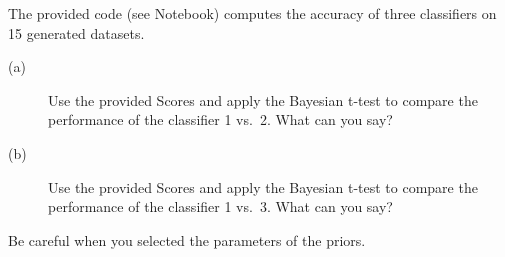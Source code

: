 \documentclass[a4paper,10pt]{article}
\begin{document}
The provided code (see Notebook) computes the accuracy of three classifiers on 15 generated datasets.
\begin{description}
 \item[(a)] Use the provided Scores and apply the Bayesian t-test to compare the performance of the classifier
 1 vs.\ 2. What can you say?
  \item[(b)] Use the provided Scores  and apply the Bayesian t-test to compare the performance of the classifier
1 vs.\ 3. What can you say?
\end{description}
Be careful when you selected the parameters of the priors.
\end{document}
